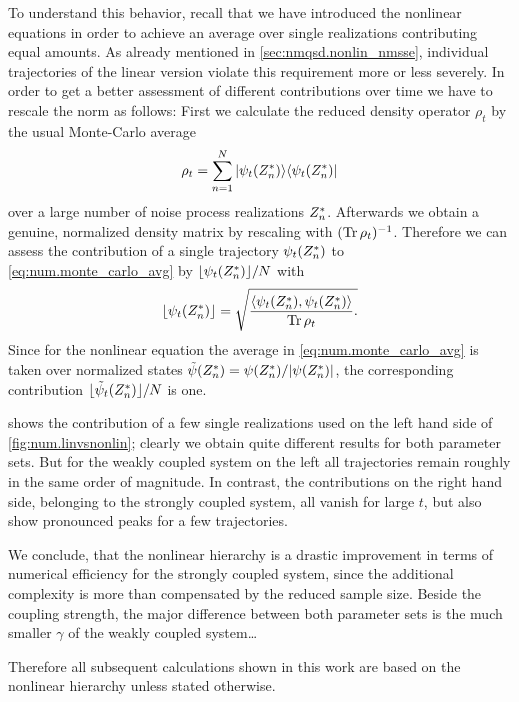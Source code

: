 To understand this behavior, recall that we have introduced the nonlinear equations in order to achieve an average over single realizations contributing equal amounts.
As already mentioned in \autoref{sec:nmqsd.nonlin_nmsse}, individual trajectories of the linear version violate this requirement more or less severely.
In order to get a better assessment of different contributions over time we have to rescale the norm as follows:
First we calculate the reduced density operator $\rho_t$ by the usual Monte-Carlo average
\begin{equation}
  \rho_t = \sum_{n=1}^N | \psi_t({Z}^*_n) \rangle \langle \psi_t({Z}^*_n) |
  \label{eq:num.monte_carlo_avg}
\end{equation}
over a large number of noise process realizations ${Z}^*_n$.
Afterwards we obtain a genuine, normalized density matrix by rescaling with $(\operatorname{Tr}{} \rho_t)^{-1}$.
Therefore we can assess the contribution of a single trajectory $\psi_t({Z}^*_n)$ to \autoref{eq:num.monte_carlo_avg} by $\lfloor \psi_t({Z}^*_n) \rfloor / N$ with
\begin{equation}
  \lfloor \psi_t(\ZZ_n) \rfloor = \sqrt{%
    \frac{\sp{\psi_t(\ZZ_n)}{\psi_t(\ZZ_n)}}{\Tr{} \rho_t}.
  }
  \label{eq:num.contribution}
\end{equation}
Since for the nonlinear equation the average in \autoref{eq:num.monte_carlo_avg} is taken over normalized states $\tilde\psi({Z}^*_n) = \psi({Z}^*_n) / \vert \psi({Z}^*_n) \vert$, the corresponding contribution $\lfloor \tilde\psi_t({Z}^*_n) \rfloor / N$ is one.

 shows the contribution of a few single realizations used on the left hand side of \autoref{fig:num.linvsnonlin}; clearly we obtain quite different results for both parameter sets.
But for the weakly coupled system on the left all trajectories remain roughly in the same order of magnitude.
In contrast, the contributions on the right hand side, belonging to the strongly coupled system, all vanish for large $t$, but also show pronounced peaks for a few trajectories.

We conclude, that the nonlinear hierarchy is a drastic improvement in terms of numerical efficiency for the strongly coupled system, since the additional complexity is more than compensated by the reduced sample size.
Beside the coupling strength, the major difference between both parameter sets is the much smaller $\gamma$ of the weakly coupled system\dots

Therefore all subsequent calculations shown in this work are based on the nonlinear hierarchy unless stated otherwise.


